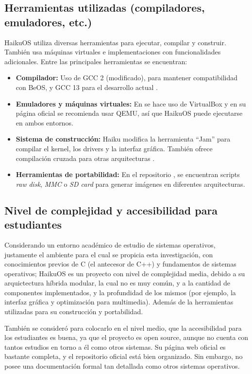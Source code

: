 \subsection{Herramientas utilizadas (compiladores, emuladores, etc.)}
HaikuOS utiliza diversas herramientas para ejecutar, compilar y construir. También usa máquinas virtuales e implementaciones con funcionalidades adicionales. Entre las principales herramientas se encuentran:
\begin{itemize}
    \item \textbf{Compilador:} Uso de GCC 2 (modificado), para mantener compatibilidad con BeOS, y GCC 13 para el desarrollo actual \citep{Installing2024haiku}.
    \item \textbf{Emuladores y máquinas virtuales:} En \citep{Installing2024haiku} se hace uso de VirtualBox y en su página oficial \citep{haikuos2025} se recomienda usar QEMU, así que HaikuOS puede ejecutarse en ambos entornos.
    \item \textbf{Sistema de construcción:} Haiku modifica la herramienta “Jam” para compilar el kernel, los drivers y la interfaz gráfica. También ofrece compilación cruzada para otras arquitecturas \citep{haikuos2025}.
    \item \textbf{Herramientas de portabilidad:} En el repositorio \citep{haiku_GitHub}, se encuentran scripts \textit{raw disk}, \textit{MMC} o \textit{SD card} para generar imágenes en diferentes arquitecturas.
\end{itemize}

\subsection{Nivel de complejidad y accesibilidad para estudiantes}
Considerando un entorno académico de estudio de sistemas operativos, justamente el ambiente para el cual se
propicia esta investigación, con conocimientos previos de C (el antecesor de C++) y fundamentos de sistemas
operativos; HaikuOS es un proyecto con nivel de complejidad media, debido a su arquictectura híbrida modular,
la cual no es muy común, y a la cantidad de componentes implementados, y la profundidad de los mismos (por
ejemplo, la interfaz gráfica y optimización para multimedia). Además de la herramientas utilizadas para su
construcción y portabilidad.

También se consideró para colocarlo en el nivel medio, que la accesibilidad para los estudiantes es buena,
ya que el proyecto es open source, aunque no cuenta con tantos estudios en torno a él como otros sistemas.
Su página web oficial es bastante completa, y el repositorio oficial está bien organizado. Sin embargo, no
posee una documentación formal tan detallada como otros sistemas operativos.